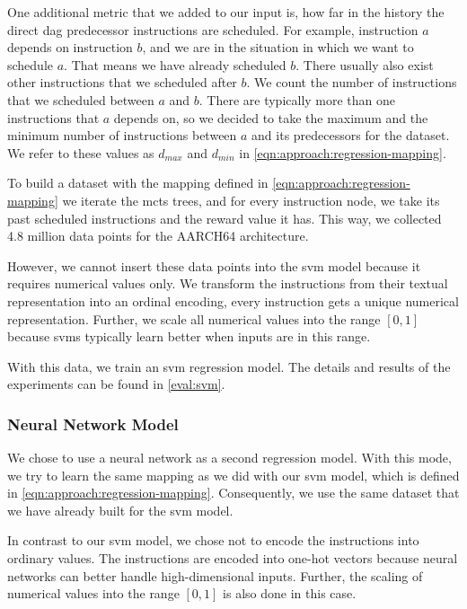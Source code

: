 One 
additional metric that we added to our input is, how far in the history the direct \ac{dag} predecessor instructions are scheduled.
For example, instruction $a$ depends on instruction $b$, and we are in the situation in which we want to schedule $a$.
That means we have already scheduled $b$.
There usually also exist other instructions that we scheduled after $b$.
We count the number of instructions that we scheduled between $a$ and $b$.
There are typically more than one instructions that $a$ depends on, so we decided to take the maximum and the minimum number of instructions between $a$ and its predecessors for the dataset.
We refer to these values as $d_{max}$ and $d_{min}$ in \cref{eqn:approach:regression-mapping}.

To build a dataset with the mapping defined in \cref{eqn:approach:regression-mapping} we iterate the \ac{mcts} trees, and for every instruction node, we take its past scheduled instructions and the reward value it has.
This way, we collected 4.8 million data points for the AARCH64 architecture.

However, we cannot insert these data points into the \ac{svm} model because it requires numerical values only.
We transform the instructions from their textual representation into an ordinal encoding, \ie every instruction gets a unique numerical representation.
Further, we scale all numerical values into the range $[0,1]$ because \acp{svm} typically learn better when inputs are in this range.

With this data, we train an \ac{svm} regression model.
The details and results of the experiments can be found in \cref{eval:svm}.

\subsubsection{Neural Network Model}
We chose to use a neural network as a second regression model.
With this mode, we try to learn the same mapping as we did with our \ac{svm} model, which is defined in \cref{eqn:approach:regression-mapping}.
Consequently, we use the same dataset that we have already built for the \ac{svm} model.

In contrast to our \ac{svm} model, we chose not to encode the instructions into ordinary values.
The instructions are encoded into one-hot vectors because neural networks can better handle high-dimensional inputs.
Further, the scaling of numerical values into the range $[0,1]$ is also done in this case.

